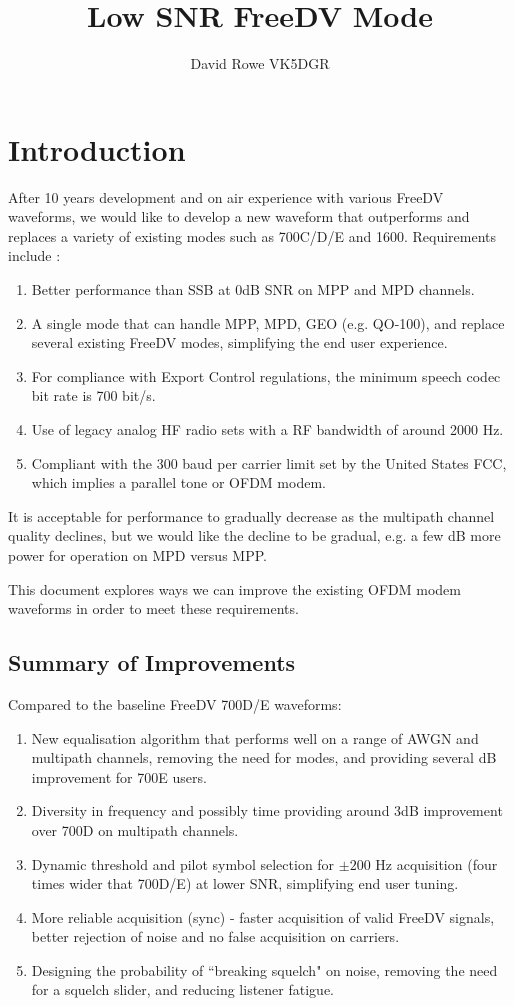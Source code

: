 \documentclass{article}
\begin{document}
\title{Low SNR FreeDV Mode}
\author{David Rowe VK5DGR}
\maketitle

\section{Introduction}

After 10 years development and on air experience with various FreeDV waveforms, we would like to develop a new waveform that outperforms and replaces a variety of existing modes such as 700C/D/E and 1600.  Requirements include \cite{freedv-020}:
\begin{enumerate}
\item Better performance than SSB at 0dB SNR on MPP and MPD channels.
\item A single mode that can handle MPP, MPD, GEO (e.g. QO-100), and replace several existing FreeDV modes, simplifying the end user experience.
\item For compliance with Export Control regulations, the minimum speech codec bit rate is 700 bit/s.
\item Use of legacy analog HF radio sets with a RF bandwidth of around 2000 Hz.
\item Compliant with the 300 baud per carrier limit set by the United States FCC, which implies a parallel tone or OFDM modem. 
\end{enumerate}
It is acceptable for performance to gradually decrease as the multipath channel quality declines, but we would like the decline to be gradual, e.g. a few dB more power for operation on MPD versus MPP.

This document explores ways we can improve the existing OFDM modem waveforms in order to meet these requirements.

\subsection{Summary of Improvements}

Compared to the baseline FreeDV 700D/E waveforms:
\begin{enumerate}
\item New equalisation algorithm that performs well on a range of AWGN and multipath channels, removing the need for modes, and providing several dB improvement for 700E users.
\item Diversity in frequency and possibly time providing around 3dB improvement over 700D on multipath channels.  
\item Dynamic threshold and pilot symbol selection for $\pm 200$ Hz acquisition (four times wider that 700D/E) at lower SNR, simplifying end user tuning.
\item More reliable acquisition (sync) - faster acquisition of valid FreeDV signals, better rejection of noise and no false acquisition on carriers.
\item Designing the probability of ``breaking squelch" on noise, removing the need for a squelch slider, and reducing listener fatigue.
\end{enumerate}
\end{document}
